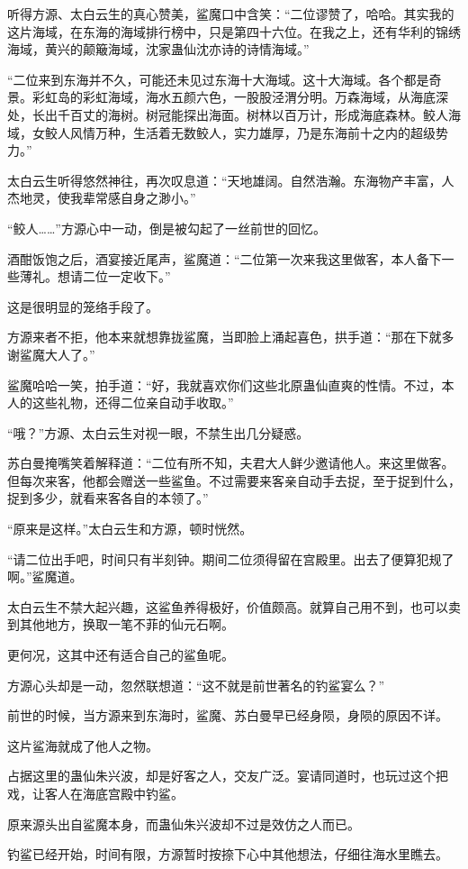 \begin{this_body}
听得方源、太白云生的真心赞美，鲨魔口中含笑：“二位谬赞了，哈哈。其实我的这片海域，在东海的海域排行榜中，只是第四十六位。在我之上，还有华利的锦绣海域，黄兴的颠簸海域，沈家蛊仙沈亦诗的诗情海域。”

“二位来到东海并不久，可能还未见过东海十大海域。这十大海域。各个都是奇景。彩虹岛的彩虹海域，海水五颜六色，一股股泾渭分明。万森海域，从海底深处，长出千百丈的海树。树冠能探出海面。树林以百万计，形成海底森林。鲛人海域，女鲛人风情万种，生活着无数鲛人，实力雄厚，乃是东海前十之内的超级势力。”

太白云生听得悠然神往，再次叹息道：“天地雄阔。自然浩瀚。东海物产丰富，人杰地灵，使我辈常感自身之渺小。”

“鲛人……”方源心中一动，倒是被勾起了一丝前世的回忆。

酒酣饭饱之后，酒宴接近尾声，鲨魔道：“二位第一次来我这里做客，本人备下一些薄礼。想请二位一定收下。”

这是很明显的笼络手段了。

方源来者不拒，他本来就想靠拢鲨魔，当即脸上涌起喜色，拱手道：“那在下就多谢鲨魔大人了。”

鲨魔哈哈一笑，拍手道：“好，我就喜欢你们这些北原蛊仙直爽的性情。不过，本人的这些礼物，还得二位亲自动手收取。”

“哦？”方源、太白云生对视一眼，不禁生出几分疑惑。

苏白曼掩嘴笑着解释道：“二位有所不知，夫君大人鲜少邀请他人。来这里做客。但每次来客，他都会赠送一些鲨鱼。不过需要来客亲自动手去捉，至于捉到什么，捉到多少，就看来客各自的本领了。”

“原来是这样。”太白云生和方源，顿时恍然。

“请二位出手吧，时间只有半刻钟。期间二位须得留在宫殿里。出去了便算犯规了啊。”鲨魔道。

太白云生不禁大起兴趣，这鲨鱼养得极好，价值颇高。就算自己用不到，也可以卖到其他地方，换取一笔不菲的仙元石啊。

更何况，这其中还有适合自己的鲨鱼呢。

方源心头却是一动，忽然联想道：“这不就是前世著名的钓鲨宴么？”

前世的时候，当方源来到东海时，鲨魔、苏白曼早已经身陨，身陨的原因不详。

这片鲨海就成了他人之物。

占据这里的蛊仙朱兴波，却是好客之人，交友广泛。宴请同道时，也玩过这个把戏，让客人在海底宫殿中钓鲨。

原来源头出自鲨魔本身，而蛊仙朱兴波却不过是效仿之人而已。

钓鲨已经开始，时间有限，方源暂时按捺下心中其他想法，仔细往海水里瞧去。


\end{this_body}
